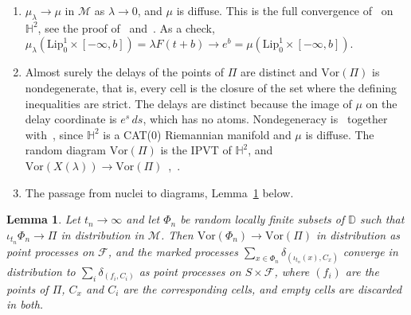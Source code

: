 \documentclass[11pt]{amsart}
\newtheorem{lemma}[theorem]{Lemma}
\theoremstyle{definition}
\theoremstyle{remark}
\newcommand{\HH}{\mathbb{H}}
\newcommand{\D}{\mathbb{D}}
\newcommand{\M}{\mathcal{M}}
\newcommand{\Lip}{\mathrm{Lip}}
\newcommand{\Vor}{\mathrm{Vor}}
\begin{document}
\begin{enumerate}
\item[(F1)] $\mu_\lambda\to\mu$ in $\M$ as $\lambda\to0$, and $\mu$ is diffuse. This is the full convergence
of~\cite[Theorem~1.2]{DK26} on $\HH^2$, see the proof of~\cite[Proposition~1.1]{DK26} and~\cite{DCE26}. As a check,
$\mu_\lambda(\Lip^1_0\times[-\infty,b])=\lambda F(t+b)\to e^b=\mu(\Lip^1_0\times[-\infty,b])$.
\item[(F2)] Almost surely the delays of the points of $\Pi$ are distinct and $\Vor(\Pi)$ is nondegenerate, that is,
every cell is the closure of the set where the defining inequalities are strict. The delays are distinct because the
image of $\mu$ on the delay coordinate is $e^s\,ds$, which has no atoms. Nondegeneracy is~\cite[Corollary~5.4]{DK26}
together with~\cite[Lemma~5.3]{DK26}, since $\HH^2$ is a CAT(0) Riemannian manifold and $\mu$ is diffuse. The random
diagram $\Vor(\Pi)$ is the IPVT of $\HH^2$, and $\Vor(X(\lambda))\to\Vor(\Pi)$~\cite{DCE26},~\cite[Proposition~1.1]{DK26}.
\item[(F3)] The passage from nuclei to diagrams, Lemma~\ref{lem:transfer} below.
\end{enumerate}

\begin{lemma}\label{lem:transfer}
Let $t_n\to\infty$ and let $\Phi_n$ be random locally finite subsets of $\D$ such that $\iota_{t_n}\Phi_n\to\Pi$ in
distribution in $\M$. Then $\Vor(\Phi_n)\to\Vor(\Pi)$ in distribution as point processes on $\mathcal F$, and the
marked processes $\sum_{x\in\Phi_n}\delta_{(\iota_{t_n}(x),C_x)}$ converge in distribution to
$\sum_i\delta_{(f_i,C_i)}$ as point processes on $S\times\mathcal F$, where $(f_i)$ are the points of $\Pi$, $C_x$ and
$C_i$ are the corresponding cells, and empty cells are discarded in both.
\end{lemma}
\end{document}
